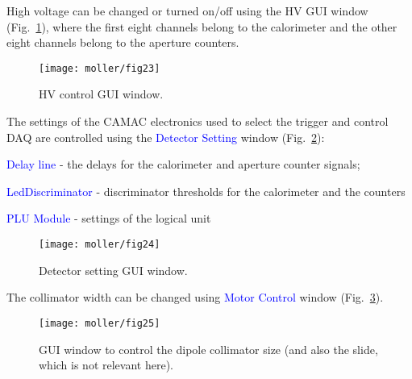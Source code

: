 {  High voltage can be changed or turned on/off using the HV GUI window 
  (Fig.~\ref{fig:hv_gui}), where the first eight channels belong to the calorimeter 
  and the other eight channels belong to the aperture counters.
   \begin{figure}[htb]
      \begin{center}
          \texttt{[image: moller/fig23]}
      \end{center}
      \caption[M{\o}ller:HV control]{HV control GUI window.
            }
      \label{fig:hv_gui} 
   \end{figure}  

  The settings of the CAMAC electronics used to select the trigger
  and control DAQ are controlled using the \textcolor{blue}{Detector Setting} window 
  (Fig.~\ref{fig:detector_gui}):
\vspace{-\parskip}
   \begin{list}{--}{\setlength{\itemsep}{-0.15cm}}
     \item \textcolor{blue}{Delay line} - the delays for the calorimeter and aperture counter signals;
     \item \textcolor{blue}{LedDiscriminator} - discriminator thresholds for the calorimeter and the counters
     \item \textcolor{blue}{PLU Module} - settings of the logical unit
   \end{list}
\vspace{-\parskip}

   \begin{figure}[htb]
      \begin{center}
          \texttt{[image: moller/fig24]}
      \end{center}
      \caption[M{\o}ller: electronics control]{Detector setting GUI window.
            }
      \label{fig:detector_gui} 
   \end{figure}  

  The collimator width can be changed using
  \textcolor{blue}{Motor Control} window (Fig.~\ref{fig:motor_gui}).
  
   \begin{figure}%
      \begin{center}
          \texttt{[image: moller/fig25]}
      \end{center}
      \caption[M{\o}ller: collimator control]{GUI window to control the dipole 
               collimator size (and also the slide, which is not relevant here).
            }
      \label{fig:motor_gui} 
   \end{figure}  
}
